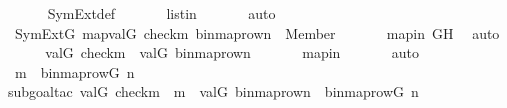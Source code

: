 \begin{isabellebody}
\ \ \ \ \isamarkupfalse%
\ SymExt{\isacharunderscore}{\kern0pt}def\ \isanewline
\ \ \ \ \isamarkupfalse%
\ listin\ \isanewline
\ \ \ \ \isamarkupfalse%
\ auto\isanewline
\isanewline
\ \ \isamarkupfalse%
\ {\isachardoublequoteopen}SymExt{\isacharparenleft}{\kern0pt}G{\isacharparenright}{\kern0pt}{\isacharcomma}{\kern0pt}\ map{\isacharparenleft}{\kern0pt}val{\isacharparenleft}{\kern0pt}G{\isacharparenright}{\kern0pt}{\isacharcomma}{\kern0pt}\ {\isacharbrackleft}{\kern0pt}check{\isacharparenleft}{\kern0pt}m{\isacharparenright}{\kern0pt}{\isacharcomma}{\kern0pt}\ binmap{\isacharunderscore}{\kern0pt}row{\isacharprime}{\kern0pt}{\isacharparenleft}{\kern0pt}n{\isacharparenright}{\kern0pt}{\isacharbrackright}{\kern0pt}{\isacharparenright}{\kern0pt}\ {\isasymTurnstile}\ Member{\isacharparenleft}{\kern0pt}{}{\isacharcomma}{\kern0pt}\ {}{\isacharparenright}{\kern0pt}{\isachardoublequoteclose}\isanewline
\ \ \ \ \isamarkupfalse%
\ mapin\ GH\ \isamarkupfalse%
\ auto\isanewline
\isanewline
\ \ \isamarkupfalse%
\ \isamarkupfalse%
\ {\isachardoublequoteopen}val{\isacharparenleft}{\kern0pt}G{\isacharcomma}{\kern0pt}\ check{\isacharparenleft}{\kern0pt}m{\isacharparenright}{\kern0pt}{\isacharparenright}{\kern0pt}\ {\isasymin}\ val{\isacharparenleft}{\kern0pt}G{\isacharcomma}{\kern0pt}\ binmap{\isacharunderscore}{\kern0pt}row{\isacharprime}{\kern0pt}{\isacharparenleft}{\kern0pt}n{\isacharparenright}{\kern0pt}{\isacharparenright}{\kern0pt}{\isachardoublequoteclose}\ \isanewline
\ \ \ \ \isamarkupfalse%
\ mapin\ \isanewline
\ \ \ \ \isamarkupfalse%
\ auto\isanewline
\ \ \isamarkupfalse%
\ \isamarkupfalse%
\ {\isachardoublequoteopen}m\ {\isasymin}\ binmap{\isacharunderscore}{\kern0pt}row{\isacharparenleft}{\kern0pt}G{\isacharcomma}{\kern0pt}\ n{\isacharparenright}{\kern0pt}{\isachardoublequoteclose}\ \isanewline
\ \ \ \ \isamarkupfalse%
{\isacharparenleft}{\kern0pt}subgoal{\isacharunderscore}{\kern0pt}tac\ {\isachardoublequoteopen}val{\isacharparenleft}{\kern0pt}G{\isacharcomma}{\kern0pt}\ check{\isacharparenleft}{\kern0pt}m{\isacharparenright}{\kern0pt}{\isacharparenright}{\kern0pt}\ {\isacharequal}{\kern0pt}\ m\ {\isasymand}\ val{\isacharparenleft}{\kern0pt}G{\isacharcomma}{\kern0pt}\ binmap{\isacharunderscore}{\kern0pt}row{\isacharprime}{\kern0pt}{\isacharparenleft}{\kern0pt}n{\isacharparenright}{\kern0pt}{\isacharparenright}{\kern0pt}\ {\isacharequal}{\kern0pt}\ binmap{\isacharunderscore}{\kern0pt}row{\isacharparenleft}{\kern0pt}G{\isacharcomma}{\kern0pt}\ n{\isacharparenright}{\kern0pt}{\isachardoublequoteclose}{\isacharparenright}{\kern0pt}\isanewline

\end{isabellebody}
